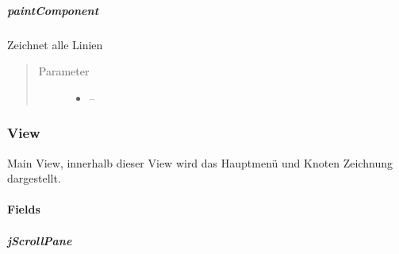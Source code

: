 \documentclass[letterpaper,10pt,ngerman]{sphinxmanual}
\begin{document}
\subparagraph{paintComponent}
\label{\detokenize{com/linuxluigi/edu/view/NodePanel:paintcomponent}}

\begin{fulllineitems}
\label{\detokenize{com/linuxluigi/edu/view/NodePanel:com.linuxluigi.edu.view.NodePanel.paintComponent(Graphics)}}
Zeichnet alle Linien
\begin{quote}\begin{description}
\item[{Parameter}] \leavevmode\begin{itemize}
\item {} 
 -- 

\end{itemize}

\end{description}\end{quote}

\end{fulllineitems}



\subsubsection{View}
\label{\detokenize{com/linuxluigi/edu/view/View::doc}}\label{\detokenize{com/linuxluigi/edu/view/View:view}}

\begin{fulllineitems}
\label{\detokenize{com/linuxluigi/edu/view/View:com.linuxluigi.edu.view.View}}
Main View, innerhalb dieser View wird das Hauptmenü und Knoten Zeichnung dargestellt.

\end{fulllineitems}



\paragraph{Fields}
\label{\detokenize{com/linuxluigi/edu/view/View:fields}}

\subparagraph{jScrollPane}
\label{\detokenize{com/linuxluigi/edu/view/View:jscrollpane}}

\begin{fulllineitems}
\label{\detokenize{com/linuxluigi/edu/view/View:com.linuxluigi.edu.view.View.jScrollPane}}
\end{fulllineitems}
\end{document}
